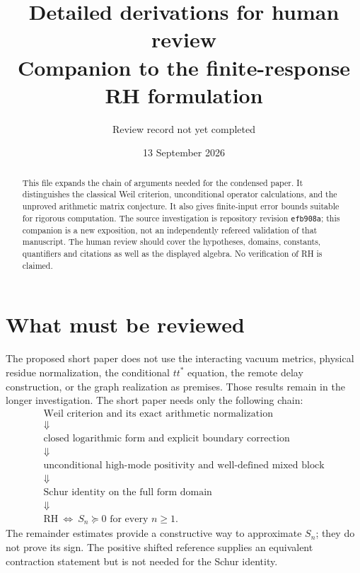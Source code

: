 
\title{Detailed derivations for human review\\\large Companion to the finite-response RH formulation}
\author{Review record not yet completed}\date{13 September 2026}
\maketitle
\begin{abstract}
This file expands the chain of arguments needed for the condensed paper.
It distinguishes the classical Weil criterion, unconditional operator
calculations, and the unproved arithmetic matrix conjecture. It also gives
finite-input error bounds suitable for rigorous computation. The source
investigation is repository revision \texttt{efb908a}; this companion is a
new exposition, not an independently refereed validation of that manuscript.
The human review should cover the hypotheses, domains, constants, quantifiers
and citations as well as the displayed algebra. No verification of RH is claimed.
\end{abstract}
\setcounter{tocdepth}{1}
\tableofcontents
\clearpage

\section{What must be reviewed}
The proposed short paper does not use the interacting vacuum metrics,
physical residue normalization, the conditional $tt^*$ equation, the remote
delay construction, or the graph realization as premises. Those results
remain in the longer investigation. The short paper needs only the following
chain:
\[
\begin{gathered}
\text{Weil criterion and its exact arithmetic normalization}\\
\Downarrow\\
\text{closed logarithmic form and explicit boundary correction}\\
\Downarrow\\
\text{unconditional high-mode positivity and well-defined mixed block}\\
\Downarrow\\
\text{Schur identity on the full form domain}\\
\Downarrow\\
\mathrm{RH}\ \Longleftrightarrow\ S_n\succeq0\text{ for every }n\ge1.
\end{gathered}
\]
The remainder estimates provide a constructive way to approximate $S_n$;
they do not prove its sign. The positive shifted reference supplies an
equivalent contraction statement but is not needed for the Schur identity.

